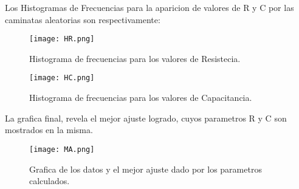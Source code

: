 \documentclass[9pt]{article}
\begin{document}
Los Histogramas de Frecuencias para la aparicion de valores de R y C por las caminatas aleatorias son respectivamente:
	\begin{figure}
		\centering
			\texttt{[image: HR.png]}
		\caption{Histograma de frecuencias para los valores de Resistecia.}
		\label{fig:HR}
	\end{figure}

	\begin{figure}
		\centering
			\texttt{[image: HC.png]}
		\caption{Histograma de frecuencias para los valores de Capacitancia.}
		\label{fig:HC}
	\end{figure}

La grafica final, revela el mejor ajuste logrado, cuyos parametros R y C son mostrados en la misma.
	\begin{figure}
		\centering
			\texttt{[image: MA.png]}
		\caption{Grafica de los datos y el mejor ajuste dado por los parametros calculados.}
		\label{fig:MA}
	\end{figure}
\end{document}
